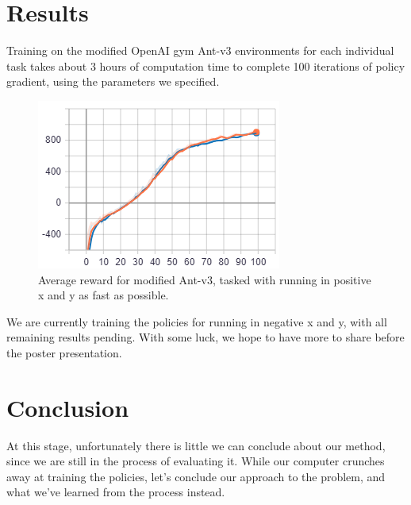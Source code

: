 \documentclass{article}
\begin{document}
\section{Results}
Training on the modified OpenAI gym Ant-v3 environments for each individual task takes about 3 hours of computation time to complete 100 iterations of policy gradient, using the parameters we specified.

\begin{figure}[H]
	\centering
	\includegraphics[width=0.9\linewidth]{antxy_avg_reward.png}
	\caption{Average reward for modified Ant-v3, tasked with running in positive x and y as fast as possible.}
\end{figure}

We are currently training the policies for running in negative x and y, with all remaining results pending. With some luck, we hope to have more to share before the poster presentation.

\section{Conclusion}
At this stage, unfortunately there is little we can conclude about our method, since we are still in the process of evaluating it. While our computer crunches away at training the policies, let's conclude our approach to the problem, and what we've learned from the process instead.
\end{document}

